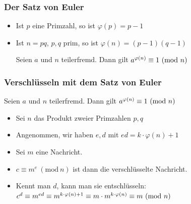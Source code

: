 \documentclass{beamer}
\begin{document}
\begin{frame}
\frametitle{Der Satz von Euler}

\begin{itemize}
	\begin{definition}
		\(\varphi(n) = \) Anzahl der zu \(n\) teilerfremden Zahlen \(\leq n\)
	\end{definition}
\pause	\item Ist \(p\) eine Primzahl, so ist \(\varphi(p) = p-1\)
	\item Ist \(n=pq\), \(p,q\) prim, so ist \(\varphi(n) = (p-1)(q-1)\)

\pause	\begin{theorem}
		Seien \(a\) und \(n\) teilerfremd.
		Dann gilt \(a^{\varphi(n)} \equiv 1 \ (\textnormal{mod}\ n)\)
	\end{theorem}
\end{itemize}
\end{frame}

\begin{frame}
\frametitle{Verschlüsseln mit dem Satz von Euler}

	\begin{theorem}
		Seien \(a\) und \(n\) teilerfremd.
		Dann gilt \(a^{\varphi(n)} \equiv 1 \ (\textnormal{mod}\ n)\)
	\end{theorem}

	\begin{itemize}
		\item Sei \(n\) das Produkt zweier Primzahlen \(p,q\)
		\item Angenommen, wir haben \(e,d\) mit \(ed = k \cdot \varphi(n) + 1\)
\pause		\item Sei \(m\) eine Nachricht.
		\item \(c \equiv m^e \ (\text{mod}\ n)\) ist dann die verschlüsselte Nachricht.
\pause		\item Kennt man \(d\), kann man sie entschlüsseln: \(c^d \equiv m^{ed} \equiv m^{k \cdot \varphi(n) + 1} \equiv m \cdot m^{k \cdot \varphi(n)} \equiv m \ (\textnormal{mod}\ n)\)
	\end{itemize}
\end{frame}
\end{document}
